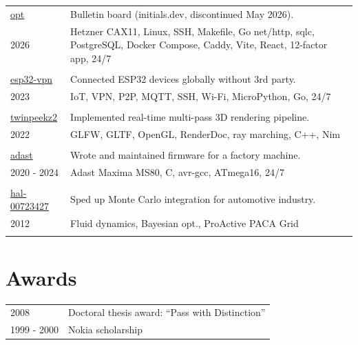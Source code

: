 \documentclass[a4paper,12pt]{article}
\begin{document}
\begin{tabularx}{\textwidth}{@{}p{3cm}X@{}}
\href{https://github.com/aabbtree77/opt}{opt} & Bulletin board (initials.dev, discontinued May 2026).\\
               2026    & Hetzner CAX11, Linux, SSH, Makefile, Go net/http, sqlc, PostgreSQL, Docker Compose, Caddy, Vite, React, 12-factor app, 24/7\\
                       &\\
\href{https://github.com/aabbtree77/esp32-vpn}{esp32-vpn} & Connected ESP32 devices globally without 3rd party.\\
               2023    & IoT, VPN, P2P, MQTT, SSH, Wi-Fi, MicroPython, Go, 24/7\\
                       &\\
\href{https://github.com/aabbtree77/twinpeekz2}{twinpeekz2}    & Implemented real-time multi-pass 3D rendering pipeline.\\
                   2022       & GLFW, GLTF, OpenGL, RenderDoc, ray marching, C++, Nim\\
                          &\\
\href{https://github.com/aabbtree77/adast}{adast} & Wrote and maintained firmware for a factory machine. \\
2020 - 2024 & Adast Maxima MS80, C, avr-gcc, ATmega16, 24/7 \\
     &\\                        
\href{https://hal.archives-ouvertes.fr/hal-00723427}{hal-00723427} & Sped up Monte Carlo integration for automotive industry.\\
                     2012 & Fluid dynamics, Bayesian opt., ProActive PACA Grid\\
                          &  \\        
\end{tabularx}

%
\section*{Awards}
%
\begin{tabularx}{\textwidth}{@{}p{3cm}X@{}}
        2008 & Doctoral thesis award: “Pass with Distinction”\\
        1999 - 2000 & Nokia scholarship
\end{tabularx}
\end{document}
